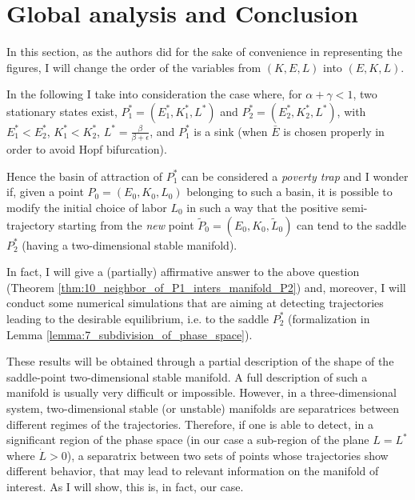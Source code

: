 \section{Global analysis and Conclusion}\label{Sec:glob_anal_conclusion}
In this section, as the authors did for the sake of convenience in representing the figures, I will change the order of the variables from $(K,E,L)$ into $(E,K,L)$.

In the following I take into consideration the case where, for $\alpha+\gamma<1$, two stationary states exist, $P_1^* = (E_1^*,K_1^*,L^*)$ and $P_2^* = (E_2^*,K_2^*,L^*)$, with $E_1^* < E_2^*$, $K_1^* < K_2^*$, $L^* = \frac{\beta}{\beta+\epsilon}$, and $P_1^*$ is a sink (when $\bar{E}$ is chosen properly in order to avoid Hopf bifurcation).

Hence the basin of attraction of $P_1^*$ can be considered a \textit{poverty trap} and I wonder if, given a point $P_0 = (E_0,K_0,L_0)$ belonging to such a basin, it is possible to modify the initial choice of labor $L_0$ in such a way that the positive semi-trajectory starting from the \textit{new} point $\widetilde{P}_0 = (E_0,K_0,\widetilde{L}_0)$ can tend to the saddle $P_2^*$ (having a two-dimensional stable manifold).

In fact, I will give a (partially) affirmative answer to the above question (Theorem \ref{thm:10_neighbor_of_P1_inters_manifold_P2}) and, moreover, I will conduct some numerical simulations that are aiming at detecting trajectories leading to the desirable equilibrium, i.e. to the saddle $P_2^*$ (formalization in Lemma \ref{lemma:7_subdivision_of_phase_space}).

These results will be obtained through a partial description of the shape of the saddle-point two-dimensional stable manifold. A full description of such a manifold is usually very difficult or impossible. However, in a three-dimensional system, two-dimensional stable (or unstable) manifolds are separatrices between different regimes of the trajectories. Therefore, if one is able to detect, in a significant region of the phase space (in our case a sub-region of the plane $L = L^*$ where $\dot{L}>0$), a separatrix between two sets of points whose trajectories show different behavior, that may lead to relevant information on the manifold of interest. As I will show, this is, in fact, our case.

